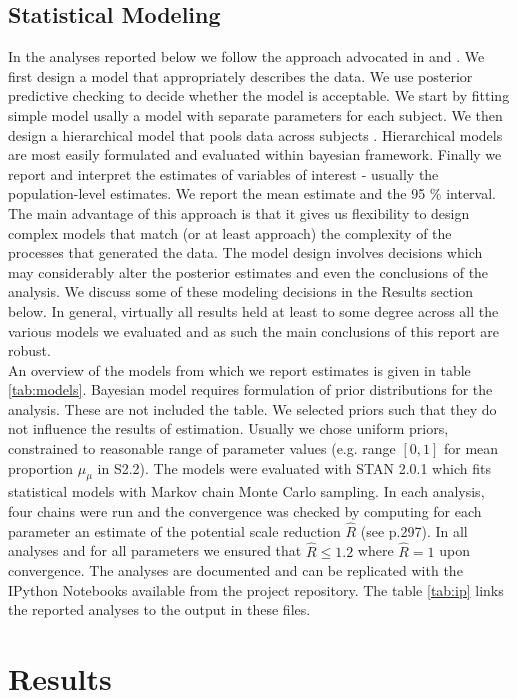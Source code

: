 \documentclass[10pt]{article}
\begin{document}
\subsection*{Statistical Modeling}
In the analyses reported below we follow the approach advocated in \cite{gelman07} and \cite{gelman13}. 
We first design a model that appropriately describes the data. 
We use posterior predictive checking to decide whether the model is acceptable. 
We start by fitting simple model usally a model with separate parameters for each subject. 
We then design a hierarchical model that pools data across subjects \cite{lee11a}. 
Hierarchical models are most easily formulated and evaluated within bayesian framework.
Finally we report and interpret the estimates of variables of interest - usually the population-level estimates. 
We report the mean estimate and the 95 \% interval.\\
The main advantage of this approach is that it gives us flexibility to design complex models that match (or at least approach) the complexity of the processes that generated the data.
The model design involves decisions which may considerably alter the posterior estimates and even the conclusions of the analysis.
We discuss some of these modeling decisions in the Results section below. In general, virtually all results held at least to some degree across all the various models we evaluated and as such the main conclusions of this report are robust.\\
An overview of the models from which we report estimates is given in table \ref{tab:models}. 
Bayesian model requires formulation of prior distributions for the analysis. 
These are not included the table. 
We selected priors such that they do not influence the results of estimation. 
Usually we chose uniform priors, constrained to reasonable range of parameter values (e.g. range $[0,1]$ for mean proportion $\mu_{\mu}$ in S2.2). 
The models were evaluated with STAN 2.0.1 which fits statistical models with Markov chain Monte Carlo sampling. 
In each analysis, four chains were run and the convergence was checked by computing for each parameter an estimate of the potential scale reduction $\hat{R}$ (see \cite{gelman03} p.297). 
In all analyses and for all parameters we ensured that $\hat{R} \leq 1.2$ where $\hat{R} = 1$ upon convergence.
The analyses are documented and can be replicated with the IPython Notebooks available from the project repository.
The table \ref{tab:ip} links the reported analyses to the output in these files. 
\section*{Results}
\end{document}
